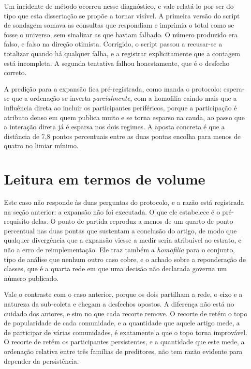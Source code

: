 Um incidente de método ocorreu nesse diagnóstico, e vale relatá-lo por ser do tipo
que esta dissertação se propõe a tornar visível. A primeira versão do script de sondagem somava
as consultas que respondiam e imprimia o total como se fosse o universo, sem sinalizar
as que haviam falhado. O número produzido era falso, e falso na direção otimista.
Corrigido, o script passou a recusar-se a totalizar quando há qualquer falha, e a
registrar explicitamente que a contagem está incompleta. A segunda tentativa falhou
honestamente, que é o desfecho correto.

A predição para a expansão fica pré-registrada, como manda o protocolo: espera-se que a
ordenação se inverta \emph{parcialmente}, com a homofilia caindo mais que a influência
direta ao incluir os participantes periféricos, porque a participação é atributo denso
em quem publica muito e se torna esparso na cauda, ao passo que a interação direta já é
esparsa nos dois regimes. A aposta concreta é que a distância de 7,8 pontos percentuais
entre as duas pontas encolha para menos de quatro no limiar mínimo.

\section{Leitura em termos de volume}

Este caso não responde às duas perguntas do protocolo, e a razão está registrada na
seção anterior: a expansão não foi executada. O que ele estabelece é o pré-requisito
delas. O ponto de partida reproduz a menos de um quarto de ponto percentual nas duas
pontas que sustentam a conclusão do artigo, de modo que qualquer divergência que a
expansão viesse a medir seria atribuível ao estrato, e não a erro de reimplementação.
Ele traz também a \emph{homofilia} para o conjunto, tipo de análise que nenhum outro
caso cobre, e o achado sobre a reponderação de classes, que é a quarta rede em que uma
decisão não declarada governa um número publicado.

Vale o contraste com o caso anterior, porque os dois partilham a rede, o eixo e a
natureza da sub-coleta e chegam a desfechos opostos. A diferença não está no cuidado
dos autores, e sim no que cada recorte remove. O recorte de
 retém o topo de popularidade de cada comunidade, e a
quantidade que aquele artigo mede, a de participar de várias comunidades, é exatamente a
que o topo torna improvável. O recorte de  retém os
participantes persistentes, e a quantidade que este mede, a ordenação relativa entre três
famílias de preditores, não tem razão evidente para depender da persistência.

